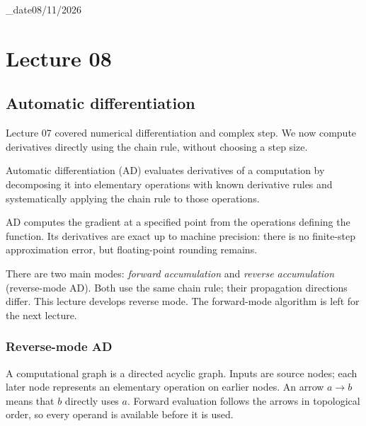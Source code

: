 \lecture_date{08/11/2026}
\chapter{Lecture 08}

\section{Automatic differentiation}
Lecture 07 covered numerical differentiation and complex step. We now compute derivatives directly using the chain rule, without choosing a step size.

\begin{definition}
Automatic differentiation (AD) evaluates derivatives of a computation by decomposing it into elementary operations with known derivative rules and systematically applying the chain rule to those operations.
\end{definition}
AD computes the gradient at a specified point from the operations defining the function. Its derivatives are exact up to machine precision: there is no finite-step approximation error, but floating-point rounding remains.

There are two main modes: \emph{forward accumulation} and \emph{reverse accumulation} (reverse-mode AD). Both use the same chain rule; their propagation directions differ. This lecture develops reverse mode. The forward-mode algorithm is left for the next lecture.

\subsection{Reverse-mode AD}
A computational graph is a directed acyclic graph. Inputs are source nodes; each later node represents an elementary operation on earlier nodes. An arrow $a\to b$ means that $b$ directly uses $a$. Forward evaluation follows the arrows in topological order, so every operand is available before it is used.

